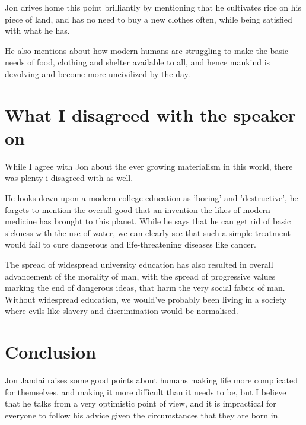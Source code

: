 \documentclass[a4paper, 12pt]{extarticle}
\begin{document}
Jon drives home this point brilliantly by mentioning that he cultivates rice on his piece of land, and has no need to buy a new clothes often, while being satisfied with what he has.

He also mentions about how modern humans are struggling to make the basic needs of food, clothing and shelter available to all, and hence mankind is devolving and become more uncivilized by the day.
     
 \section*{What I disagreed with the speaker on}
 
While I agree with Jon about the ever growing materialism in this world, there was plenty i disagreed with as well. 

He looks down upon a modern college education as 'boring' and 'destructive', he forgets to mention the overall good that an invention the likes of modern medicine has brought to this planet. While he says that he can get rid of basic sickness with the use of water, we can clearly see that such a simple treatment would fail to cure dangerous and life-threatening diseases like cancer. 

The spread of widespread university education has also resulted in overall advancement of the morality of man, with the spread of progressive values marking the end of dangerous ideas, that harm the very social fabric of man. Without widespread education, we would've probably been living in a society where evils like slavery and discrimination would be normalised. 

\section*{Conclusion}

Jon Jandai raises some good points about humans making life more complicated for themselves, and making it more difficult than it needs to be, but I believe that he talks from a very optimistic point of view, and it is impractical for everyone to follow his advice given the circumstances that they are born in.
\end{document}
